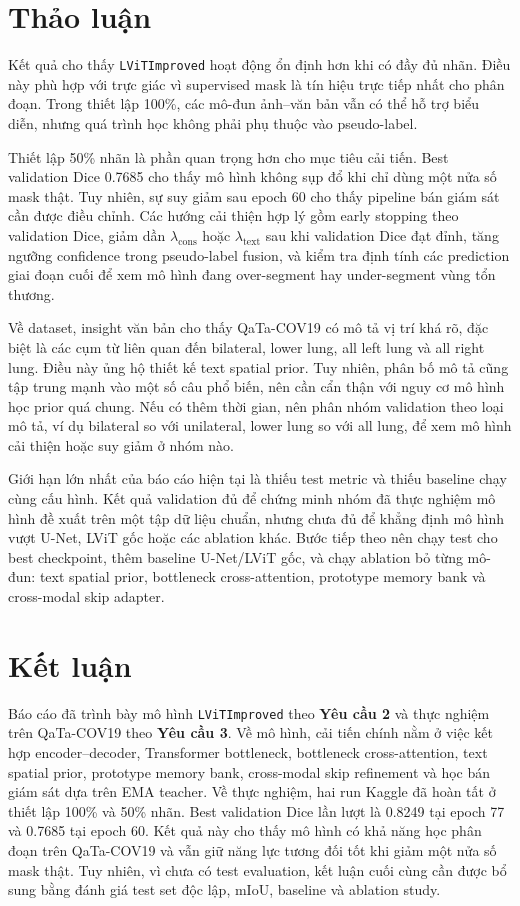 \section{Thảo luận}

Kết quả cho thấy \texttt{LViTImproved} hoạt động ổn định hơn khi có đầy đủ nhãn. Điều này phù hợp với trực giác vì supervised mask là tín hiệu trực tiếp nhất cho phân đoạn. Trong thiết lập 100\%, các mô-đun ảnh--văn bản vẫn có thể hỗ trợ biểu diễn, nhưng quá trình học không phải phụ thuộc vào pseudo-label.

Thiết lập 50\% nhãn là phần quan trọng hơn cho mục tiêu cải tiến. Best validation Dice 0.7685 cho thấy mô hình không sụp đổ khi chỉ dùng một nửa số mask thật. Tuy nhiên, sự suy giảm sau epoch 60 cho thấy pipeline bán giám sát cần được điều chỉnh. Các hướng cải thiện hợp lý gồm early stopping theo validation Dice, giảm dần $\lambda_{\mathrm{cons}}$ hoặc $\lambda_{\mathrm{text}}$ sau khi validation Dice đạt đỉnh, tăng ngưỡng confidence trong pseudo-label fusion, và kiểm tra định tính các prediction giai đoạn cuối để xem mô hình đang over-segment hay under-segment vùng tổn thương.

Về dataset, insight văn bản cho thấy QaTa-COV19 có mô tả vị trí khá rõ, đặc biệt là các cụm từ liên quan đến bilateral, lower lung, all left lung và all right lung. Điều này ủng hộ thiết kế text spatial prior. Tuy nhiên, phân bố mô tả cũng tập trung mạnh vào một số câu phổ biến, nên cần cẩn thận với nguy cơ mô hình học prior quá chung. Nếu có thêm thời gian, nên phân nhóm validation theo loại mô tả, ví dụ bilateral so với unilateral, lower lung so với all lung, để xem mô hình cải thiện hoặc suy giảm ở nhóm nào.

Giới hạn lớn nhất của báo cáo hiện tại là thiếu test metric và thiếu baseline chạy cùng cấu hình. Kết quả validation đủ để chứng minh nhóm đã thực nghiệm mô hình đề xuất trên một tập dữ liệu chuẩn, nhưng chưa đủ để khẳng định mô hình vượt U-Net, LViT gốc hoặc các ablation khác. Bước tiếp theo nên chạy test cho best checkpoint, thêm baseline U-Net/LViT gốc, và chạy ablation bỏ từng mô-đun: text spatial prior, bottleneck cross-attention, prototype memory bank và cross-modal skip adapter.

\section{Kết luận}

Báo cáo đã trình bày mô hình \texttt{LViTImproved} theo \textbf{Yêu cầu 2} và thực nghiệm trên QaTa-COV19 theo \textbf{Yêu cầu 3}. Về mô hình, cải tiến chính nằm ở việc kết hợp encoder--decoder, Transformer bottleneck, bottleneck cross-attention, text spatial prior, prototype memory bank, cross-modal skip refinement và học bán giám sát dựa trên EMA teacher. Về thực nghiệm, hai run Kaggle đã hoàn tất ở thiết lập 100\% và 50\% nhãn. Best validation Dice lần lượt là 0.8249 tại epoch 77 và 0.7685 tại epoch 60. Kết quả này cho thấy mô hình có khả năng học phân đoạn trên QaTa-COV19 và vẫn giữ năng lực tương đối tốt khi giảm một nửa số mask thật. Tuy nhiên, vì chưa có test evaluation, kết luận cuối cùng cần được bổ sung bằng đánh giá test set độc lập, mIoU, baseline và ablation study.

